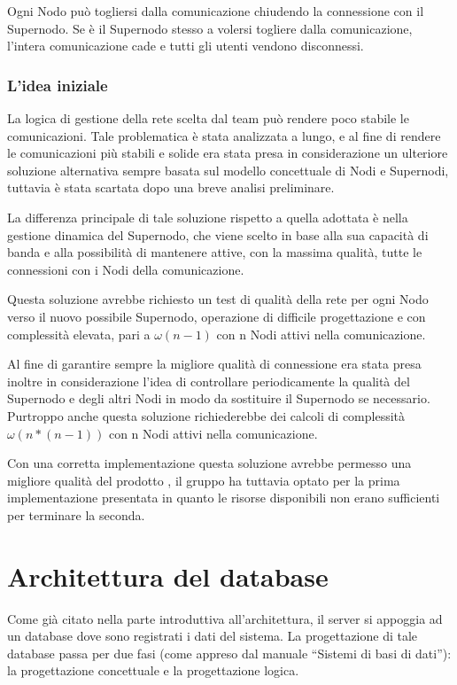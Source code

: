 Ogni Nodo può togliersi dalla comunicazione chiudendo la connessione con il Supernodo. Se è il Supernodo stesso a volersi togliere dalla comunicazione, l'intera comunicazione cade e tutti gli utenti vendono disconnessi.

\subsubsection{L'idea iniziale}
La logica di gestione della rete scelta dal team può rendere poco stabile le comunicazioni. Tale problematica è stata analizzata a lungo, e al fine di rendere le comunicazioni più stabili e solide era stata presa in considerazione un ulteriore soluzione alternativa sempre basata sul modello concettuale di Nodi e Supernodi, tuttavia è stata scartata dopo una breve analisi preliminare.

La differenza principale di tale soluzione rispetto a quella adottata è nella gestione dinamica del Supernodo, che viene scelto in base alla sua capacità di banda e alla possibilità di mantenere attive, con la massima qualità, tutte le connessioni con i Nodi della comunicazione.

Questa soluzione avrebbe richiesto un test di qualità della rete per ogni Nodo verso il nuovo possibile Supernodo, operazione di difficile progettazione e con complessità elevata, pari a $\omega(n-1)$ con n Nodi attivi nella comunicazione.

Al fine di garantire sempre la migliore qualità di connessione era stata presa inoltre in considerazione l'idea di controllare periodicamente la qualità del Supernodo e degli altri Nodi in modo da sostituire il Supernodo se necessario. Purtroppo anche questa soluzione richiederebbe dei calcoli di complessità $\omega(n*(n-1))$ con n Nodi attivi nella comunicazione.

Con una corretta implementazione questa soluzione avrebbe permesso una migliore qualità del prodotto \caName, il gruppo ha tuttavia optato per la prima implementazione presentata in quanto le risorse disponibili non erano sufficienti per terminare la seconda.
\clearpage

\section{Architettura del database}\label{sec:database}

Come già citato nella parte introduttiva all'architettura, il server si appoggia ad un database dove sono registrati i dati del sistema. La progettazione di tale database passa per due fasi (come appreso dal manuale ``Sistemi di basi di dati''): la progettazione concettuale e la progettazione logica.

